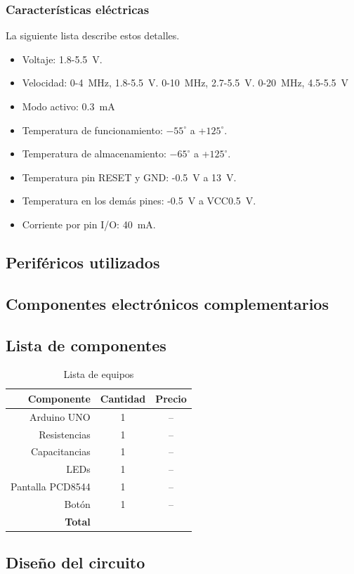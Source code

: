 \subsubsection*{Características eléctricas}
La siguiente lista describe estos detalles.
\begin{itemize}
\item Voltaje: 1.8-\SI{5.5}{\volt}.
\item Velocidad: 0-\SI{4}{\mega\Hz},  1.8-\SI{5.5}{\volt}. 0-\SI{10}{\mega\Hz},  2.7-\SI{5.5}{\volt}. 0-\SI{20}{\mega\Hz},  4.5-\SI{5.5}{\volt}
\item Modo activo: \SI{0.3}{\mA}
\item Temperatura de funcionamiento: $-55^\circ$ a +$125^\circ$.
\item Temperatura de almacenamiento: $-65^\circ$ a +$125^\circ$.
\item Temperatura pin RESET y GND: -\SI{0.5}{\volt} a \SI{13}{\volt}.
\item Temperatura en los demás pines: -\SI{0.5}{\volt} a VCC\SI{0.5}{\volt}.
\item Corriente por pin I/O: \SI{40}{\mA}.


\end{itemize}

\subsection*{Periféricos utilizados}

\subsection*{Componentes electrónicos complementarios}

    
\subsection*{Lista de componentes}

\begin{table}[H]
\caption{Lista de equipos}
\label{table_2}
\begin{center}
\begin{tabular}{r|cc}
\hline
\textbf{Componente}&\textbf{Cantidad}&\textbf{Precio}\\
 \hline
Arduino UNO&1   &-- \\ \hline 
Resistencias &1   &-- \\ \hline 
Capacitancias&1   &-- \\ \hline 
LEDs&1   &-- \\ \hline 
Pantalla PCD8544&1   &-- \\ \hline 
Botón&1   &-- \\ \hline 
 \textbf{Total}& &  \\
 \hline
\end{tabular}
\end{center}
\end{table}

\subsection*{Diseño del circuito}
\newpage
